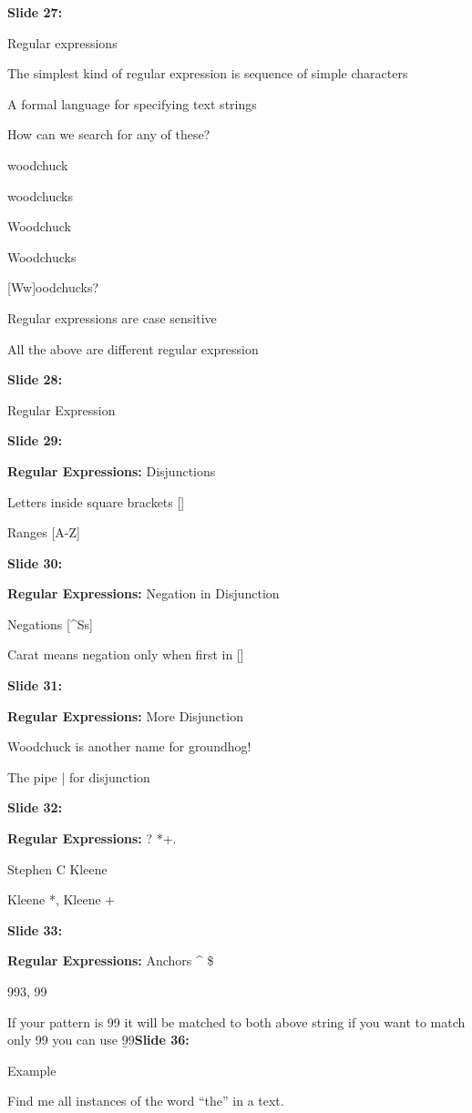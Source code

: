 \documentclass[11pt,a4paper]{article}
\begin{document}
\textbf{Slide 27:}

Regular expressions

The simplest kind of regular expression is sequence of simple characters

A formal language for specifying text strings

How can we search for any of these?

woodchuck

woodchucks

Woodchuck

Woodchucks

[Ww]oodchucks?

Regular expressions are case sensitive

All the above are different regular expression

\textbf{Slide 28:}

Regular Expression

\textbf{Slide 29:}

\textbf{Regular Expressions:}  Disjunctions

Letters inside square brackets []

Ranges [A-Z]

\textbf{Slide 30:}

\textbf{Regular Expressions:}  Negation in Disjunction

Negations [^Ss]

Carat means negation only when first in []

\textbf{Slide 31:}

\textbf{Regular Expressions:}  More Disjunction

Woodchuck is another name for groundhog!

The pipe | for disjunction

\textbf{Slide 32:}

\textbf{Regular Expressions:}  ? *+.

Stephen C Kleene

Kleene *,   Kleene +

\textbf{Slide 33:}

\textbf{Regular Expressions:}  Anchors  ^   \$

993, 99

If your pattern is 99 it will be matched to both above string if you want to match only 99 you can use \b99\b

\textbf{Slide 36:}

Example

Find me all instances of the word “the” in a text.
\end{document}
